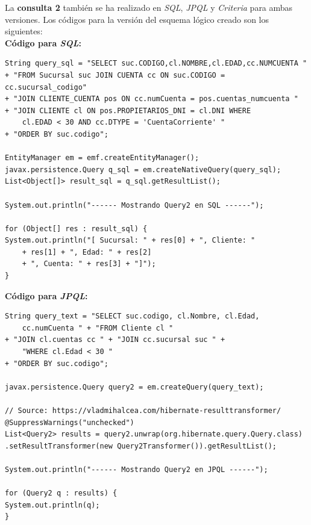 \documentclass[11pt,a4paper]{article}
\begin{document}
\newpage
La \textbf{consulta 2} también se ha realizado en \textit{SQL}, \textit{JPQL} y \textit{Criteria} para ambas versiones.
Los códigos para la versión del esquema lógico creado son los siguientes:\\

\textbf{Código para \textit{SQL}:}
\begin{lstlisting}
String query_sql = "SELECT suc.CODIGO,cl.NOMBRE,cl.EDAD,cc.NUMCUENTA "
+ "FROM Sucursal suc JOIN CUENTA cc ON suc.CODIGO = cc.sucursal_codigo"
+ "JOIN CLIENTE_CUENTA pos ON cc.numCuenta = pos.cuentas_numcuenta "
+ "JOIN CLIENTE cl ON pos.PROPIETARIOS_DNI = cl.DNI WHERE 
	cl.EDAD < 30 AND cc.DTYPE = 'CuentaCorriente' "
+ "ORDER BY suc.codigo";

EntityManager em = emf.createEntityManager();
javax.persistence.Query q_sql = em.createNativeQuery(query_sql);
List<Object[]> result_sql = q_sql.getResultList();

System.out.println("------ Mostrando Query2 en SQL ------");

for (Object[] res : result_sql) {
System.out.println("[ Sucursal: " + res[0] + ", Cliente: "
	+ res[1] + ", Edad: " + res[2]
	+ ", Cuenta: " + res[3] + "]");
}
\end{lstlisting}

\textbf{Código para \textit{JPQL}:}
\begin{lstlisting}
String query_text = "SELECT suc.codigo, cl.Nombre, cl.Edad,
	cc.numCuenta " + "FROM Cliente cl "
+ "JOIN cl.cuentas cc " + "JOIN cc.sucursal suc " + 
	"WHERE cl.Edad < 30 "
+ "ORDER BY suc.codigo";

javax.persistence.Query query2 = em.createQuery(query_text);

// Source: https://vladmihalcea.com/hibernate-resulttransformer/
@SuppressWarnings("unchecked")
List<Query2> results = query2.unwrap(org.hibernate.query.Query.class)
.setResultTransformer(new Query2Transformer()).getResultList();

System.out.println("------ Mostrando Query2 en JPQL ------");

for (Query2 q : results) {
System.out.println(q);
}
\end{lstlisting}
\end{document}
